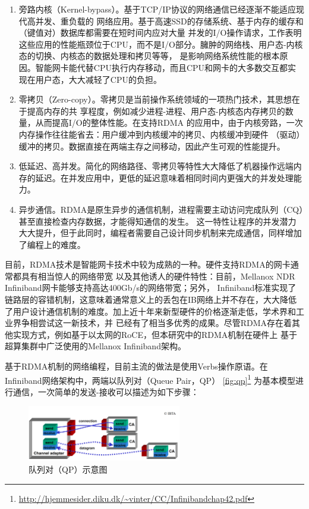 \begin{enumerate}
	\item 旁路内核（Kernel-bypass）。基于TCP/IP协议的网络通信已经逐渐不能适应现代高并发、重负载的
	网络应用。基于高速SSD的存储系统、基于内存的缓存和（键值对）数据库都需要在短时间内应对大量
	并发的I/O操作请求，工作\cite{mitchell2013using}表明这些应用的性能瓶颈位于CPU，而不是I/O部分。臃肿的网络栈、用户态-内核态的切换、内核态的数据处理和拷贝等等，
	是影响网络系统性能的根本原因。智能网卡能代替CPU执行内存移动，而且CPU和网卡的大多数交互都实现在用户态，大大减轻了CPU的负担。
	\item 零拷贝（Zero-copy）。零拷贝是当前操作系统领域的一项热门技术\cite{taranov2021naos}\cite{chapman2010introducing}，其思想在于提高内存的共
	享程度，例如减少进程-进程、用户态-内核态内存拷贝的数量，从而提高I/O的整体性能。在支持RDMA
	的应用中，由于内核旁路，一次内存操作往往能省去：用户缓冲到内核缓冲的拷贝、内核缓冲到硬件
	（驱动）缓冲的拷贝。数据直接在两端主存之间移动，因此产生可观的性能提升\cite{taranov2021naos}。
	\item 低延迟、高并发。简化的网络路径、零拷贝等特性大大降低了机器操作远端内存的延迟\cite{neugebauer2018understanding}。在并发应用中，更低的延迟意味着相同时间内更强大的并发处理能力。
	\item 异步通信。RDMA是原生异步的通信机制，进程需要主动访问完成队列（CQ）甚至直接检查内存数据，才能得知通信的发生。
	这一特性让程序的并发潜力大大提升，但于此同时，编程者需要自己设计同步机制来完成通信，同样增加了编程上的难度。
\end{enumerate}

目前，RDMA技术是智能网卡技术中较为成熟的一种。硬件支持RDMA的网卡通常都具有相当惊人的网络带宽
以及其他诱人的硬件特性：目前，Mellanox NDR Infiniband网卡能够支持高达400Gb/s的网络带宽；另外，
Infiniband标准实现了链路层的容错机制，这意味着通常意义上的丢包在IB网络上并不存在，大大降低
了用户设计通信机制的难度。加上近十年来新型硬件的价格逐渐走低\cite{mitchell2013using}，学术界和工业界争相尝试这一新技术，并
已经有了相当多优秀的成果。尽管RDMA存在着其他实现方式，例如基于以太网的RoCE，但本研究中的RDMA机制在硬件上
基于超算集群中广泛使用的Mellanox Infiniband架构。

基于RDMA机制的网络编程，目前主流的做法是使用Verbs操作原语\cite{pfister2001introduction}。在Infiniband网络架构中，两端以队列对（Queue Pair，QP）
\autoref{fig:qp}\footnote{\url{http://hjemmesider.diku.dk/~vinter/CC/Infinibandchap42.pdf}}
为基本模型进行通信，一次简单的发送-接收可以描述为如下步骤：

\begin{figure}[h]
	\centering
	\includegraphics[width=0.6\textwidth]{image/chap01/qp.png}
	\caption{队列对（QP）示意图}
	\label{fig:qp}
\end{figure}

